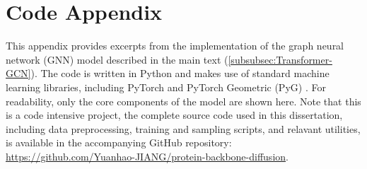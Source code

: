 \documentclass[a4paper,12pt]{article}
\begin{document}
\appendix
\section{Code Appendix}
This appendix provides excerpts from the implementation of the graph neural network (GNN) model described in the main text (\cref{subsubsec:Transformer-GCN}). The code is written in Python and makes use of standard machine learning libraries, including PyTorch and PyTorch Geometric (PyG) \citep{PyG1.0,PyG2.0}. For readability, only the core components of the model are shown here. Note that this is a code intensive project, the complete source code used in this dissertation, including data preprocessing, training and sampling scripts, and relavant utilities, is available in the accompanying GitHub repository: \url{https://github.com/Yuanhao-JIANG/protein-backbone-diffusion}.
\end{document}
